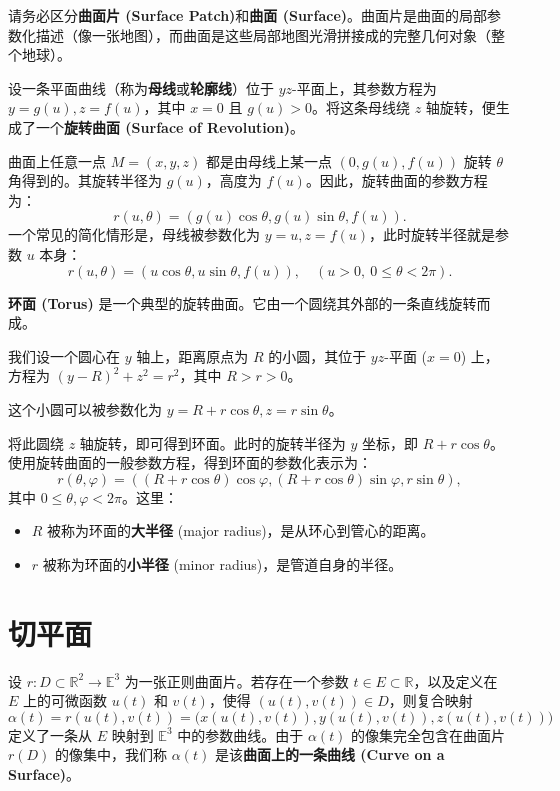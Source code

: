 \documentclass[lang=cn,10pt,thmcnt=section]{elegantbook}
\begin{document}
\begin{remark}
    请务必区分\textbf{曲面片 (Surface Patch)}和\textbf{曲面 (Surface)}。曲面片是曲面的局部参数化描述（像一张地图），而曲面是这些局部地图光滑拼接成的完整几何对象（整个地球）。
\end{remark}

\begin{example}[旋转曲面]
    设一条平面曲线（称为\textbf{母线}或\textbf{轮廓线}）位于 $yz$-平面上，其参数方程为 $y=g(u), z=f(u)$，其中 $x=0$ 且 $g(u)>0$。将这条母线绕 $z$ 轴旋转，便生成了一个\textbf{旋转曲面 (Surface of Revolution)}。
    
    曲面上任意一点 $M = (x, y, z)$ 都是由母线上某一点 $(0, g(u), f(u))$ 旋转 $\theta$ 角得到的。其旋转半径为 $g(u)$，高度为 $f(u)$。因此，旋转曲面的参数方程为：
    \[
    r(u, \theta) = (g(u) \cos \theta, g(u) \sin \theta, f(u)).
    \]
    一个常见的简化情形是，母线被参数化为 $y=u, z=f(u)$，此时旋转半径就是参数 $u$ 本身：
    \[
    r(u, \theta) = (u \cos \theta, u \sin \theta, f(u)), \quad (u > 0, \ 0 \leq \theta < 2\pi).
    \]
\end{example}

\begin{example}[环面]
    \textbf{环面 (Torus)} 是一个典型的旋转曲面。它由一个圆绕其外部的一条直线旋转而成。
    
    我们设一个圆心在 $y$ 轴上，距离原点为 $R$ 的小圆，其位于 $yz$-平面 ($x=0$) 上，方程为 $(y - R)^2 + z^2 = r^2$，其中 $R > r > 0$。
    
    这个小圆可以被参数化为 $y = R + r \cos \theta, z = r \sin \theta$。
    
    将此圆绕 $z$ 轴旋转，即可得到环面。此时的旋转半径为 $y$ 坐标，即 $R + r \cos \theta$。使用旋转曲面的一般参数方程，得到环面的参数化表示为：
    \[
    r(\theta, \varphi) = ((R + r \cos \theta) \cos \varphi, (R + r \cos \theta) \sin \varphi, r \sin \theta),
    \]
    其中 $0 \le \theta, \varphi < 2\pi$。这里：
    \begin{itemize}
        \item $R$ 被称为环面的\textbf{大半径} (major radius)，是从环心到管心的距离。
        \item $r$ 被称为环面的\textbf{小半径} (minor radius)，是管道自身的半径。
    \end{itemize}
\end{example}
\section{切平面}
\begin{definition}[曲面上的曲线]
    设 $r: D \subset \mathbb{R}^2 \to \mathbb{E}^3$ 为一张正则曲面片。若存在一个参数 $t \in E \subset \mathbb{R}$，以及定义在 $E$ 上的可微函数 $u(t)$ 和 $v(t)$，使得 $(u(t), v(t)) \in D$，则复合映射
    \[
    \alpha(t) = r(u(t), v(t)) = \big(x(u(t), v(t)), y(u(t), v(t)), z(u(t), v(t))\big)
    \]
    定义了一条从 $E$ 映射到 $\mathbb{E}^3$ 中的参数曲线。由于 $\alpha(t)$ 的像集完全包含在曲面片 $r(D)$ 的像集中，我们称 $\alpha(t)$ 是该\textbf{曲面上的一条曲线 (Curve on a Surface)}。
\end{definition}
\end{document}
